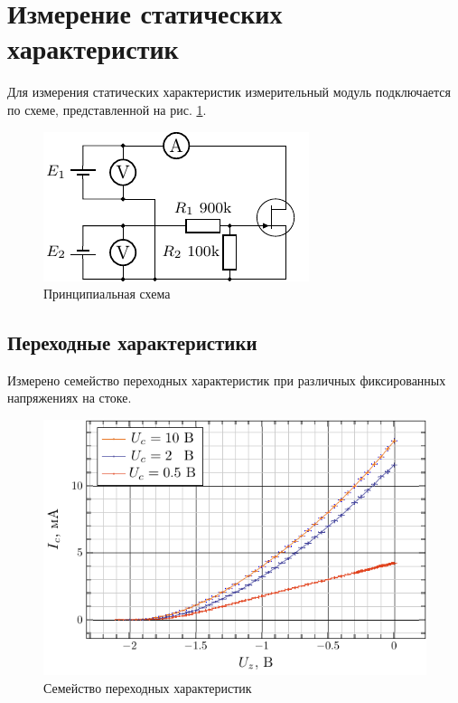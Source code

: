 \documentclass[a4paper,14pt]{extarticle}
\begin{document}
\newpage

\section{Измерение статических характеристик}

Для измерения статических характеристик измерительный модуль подключается по схеме, представленной на рис. \ref{fig:chem1}.

\begin{figure}[H]
	\centering
	\includegraphics[scale=1.75]{fig/chem1}
	\caption{Принципиальная схема}
	\label{fig:chem1}
\end{figure}

\subsection{Переходные характеристики}
Измерено семейство переходных характеристик при различных фиксированных напряжениях на стоке.

\begin{figure}[H]
	\centering
	\includegraphics[scale=1.5]{fig/icuz.pdf}
	\vspace{-1em}
	\caption{Семейство переходных характеристик}
	\label{fig:2}
\end{figure}
\end{document}
